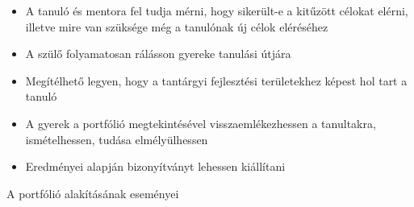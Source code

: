 \begin{itemize}
\item A tanuló és mentora fel tudja mérni, hogy sikerült-e a kitűzött célokat elérni, illetve mire van szüksége még a tanulónak új célok eléréséhez

\item A szülő folyamatosan rálásson gyereke tanulási útjára

\item Megítélhető legyen, hogy a tantárgyi fejlesztési területekhez képest hol tart a tanuló

\item A gyerek a portfólió megtekintésével visszaemlékezhessen a tanultakra, ismételhessen, tudása elmélyülhessen

\item Eredményei alapján bizonyítványt lehessen kiállítani

\end{itemize}
A portfólió alakításának eseményei
